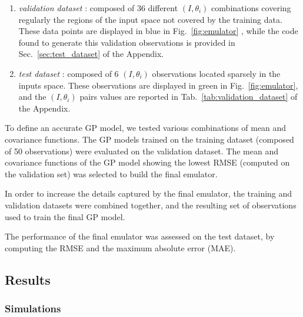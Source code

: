 \begin{enumerate}
   \item \emph{validation dataset} : composed of \num{36} different $(I, \theta_i)$ combinations covering regularly the regions of the input space not covered by the training data. These data points are displayed in blue in Fig.~\ref{fig:emulator} , while the code found to generate this validation observations is provided in Sec.~\ref{sec:test_dataset} of the Appendix.
   \item \emph{test dataset} : composed of \num{6} $(I, \theta_i)$ observations located sparsely in the inputs space. These observations are displayed in green in Fig.~\ref{fig:emulator}, and the $(I, \theta_i)$ pairs values  are reported in Tab.~\ref{tab:validation_dataset} of the Appendix.
\end{enumerate}

To define an accurate GP model, we tested various combinations of mean and covariance functions. 
The GP models trained on the training dataset (composed of 50 observations) were evaluated on the validation dataset. The mean and covariance functions of the GP model showing the lowest RMSE (computed on the validation set) was selected to build the final emulator. 

In order to increase the details captured by the final emulator, the training and validation datasets were combined together, and the resulting set of observations used to train the final GP model. 
 
The performance of the final emulator was assessed on the test dataset, by computing the RMSE and the maximum absolute error (MAE).

\subsection{Results}
\subsubsection{Simulations}\label{sec:simulations_results}

